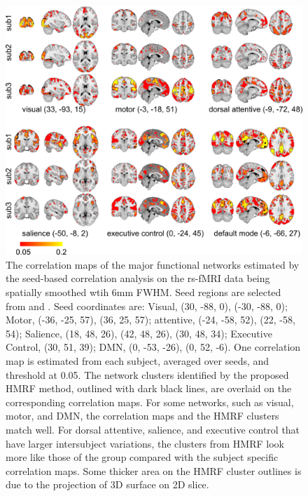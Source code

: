 \documentclass[review,authoryear]{elsarticle}
\begin{document}
\begin{figure}
\includegraphics[width=1.0\textwidth]{figures/corr_overlay/corr_overlay_thick}
\caption{The correlation maps of the major functional networks estimated by the
  seed-based correlation analysis on the rs-fMRI data being spatially smoothed
  wtih 6mm FWHM. Seed regions are selected from \citet{van2010intrinsic} and
  \citet{seeley2007dissociable}. Seed coordinates are: Visual, (30, -88, 0),
  (-30, -88, 0); Motor, (-36, -25, 57), (36, 25, 57); attentive, (-24, -58, 52),
  (22, -58, 54); Salience, (18, 48, 26), (42, 48, 26), (30, 48, 34); Executive
  Control, (30, 51, 39); DMN, (0, -53, -26), (0, 52, -6). One correlation map is
  estimated from each subject, averaged over seeds, and threshold at 0.05. The
  network clusters identified by the proposed HMRF method, outlined with dark
  black lines, are overlaid on the corresponding correlation maps. For some
  networks, such as visual, motor, and DMN, the correlation maps and the HMRF
  clusters match well. For dorsal attentive, salience, and executive control
  that have larger intersubject variations, the clusters from HMRF look more
  like those of the group compared with the subject specific correlation
  maps. Some thicker area on the HMRF cluster outlines is due to the projection of
  3D surface on 2D slice. }

\end{figure}



\end{document}
